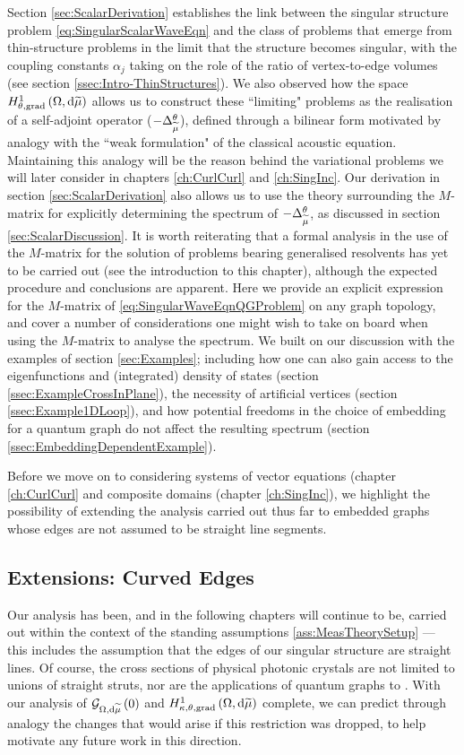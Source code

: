 Section \ref{sec:ScalarDerivation} establishes the link between the singular structure problem \eqref{eq:SingularScalarWaveEqn} and the class of problems that emerge from thin-structure problems in the limit that the structure becomes singular, with the coupling constants $\alpha_j$ taking on the role of the ratio of vertex-to-edge volumes (see section \ref{ssec:Intro-ThinStructures}).
We also observed how the space $H^1_{\theta, \mathrm{grad}}\left( \Omega, \mathrm{d}\widetilde{\mu} \right)$ allows us to construct these ``limiting" problems as the realisation of a self-adjoint operator ($-\Delta_{\widetilde{\mu}}^{\theta}$), defined through a bilinear form motivated by analogy with the ``weak formulation" of the classical acoustic equation.
Maintaining this analogy will be the reason behind the variational problems we will later consider in chapters \ref{ch:CurlCurl} and \ref{ch:SingInc}.
Our derivation in section \ref{sec:ScalarDerivation} also allows us to use the theory surrounding the $M$-matrix for explicitly determining the spectrum of $-\Delta_{\widetilde{\mu}}^{\theta}$, as discussed in section \ref{sec:ScalarDiscussion}.
It is worth reiterating that a formal analysis in the use of the $M$-matrix for the solution of problems bearing generalised resolvents has yet to be carried out (see the introduction to this chapter), although the expected procedure and conclusions are apparent.
Here we provide an explicit expression for the $M$-matrix of \eqref{eq:SingularWaveEqnQGProblem} on any graph topology, and cover a number of considerations one might wish to take on board when using the $M$-matrix to analyse the spectrum.
We built on our discussion with the examples of section \ref{sec:Examples}; including how one can also gain access to the eigenfunctions and (integrated) density of states (section \ref{ssec:ExampleCrossInPlane}), the necessity of artificial vertices (section \ref{ssec:Example1DLoop}), and how potential freedoms in the choice of embedding for a quantum graph do not affect the resulting spectrum (section \ref{ssec:EmbeddingDependentExample}).

Before we move on to considering systems of vector equations (chapter \ref{ch:CurlCurl} and composite domains (chapter \ref{ch:SingInc}), we highlight the possibility of extending the analysis carried out thus far to embedded graphs whose edges are not assumed to be straight line segments.

\subsection{Extensions: Curved Edges}
Our analysis has been, and in the following chapters will continue to be, carried out within the context of the standing assumptions \ref{ass:MeasTheorySetup} --- this includes the assumption that the edges of our singular structure are straight lines.
Of course, the cross sections of physical photonic crystals are not limited to unions of straight struts, nor are the applications of quantum graphs to .
With our analysis of $\mathcal{G}_{ \Omega, \mathrm{d}\widetilde{\mu}}\left( 0 \right)$ and $H^1_{\kappa,\theta,\mathrm{grad}}\left( \Omega, \mathrm{d}\widetilde{\mu} \right)$ complete, we can predict through analogy the changes that would arise if this restriction was dropped, to help motivate any future work in this direction.

